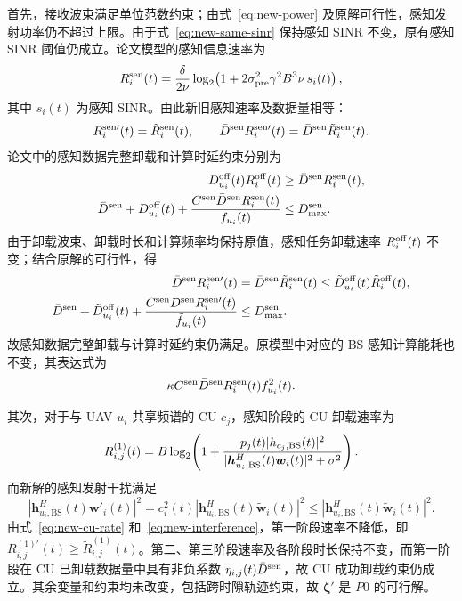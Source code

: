 \documentclass[11pt,a4paper]{ctexart}
\begin{document}
首先，接收波束满足单位范数约束；由式~\eqref{eq:new-power} 及原解可行性，感知发射功率仍不超过上限。由于式~\eqref{eq:new-same-sinr} 保持感知 SINR 不变，原有感知 SINR 阈值仍成立。论文模型的感知信息速率为
\begin{equation}\label{eq:new-rate-formula}
R_i^{\rm sen}(t)=\frac{\delta}{2\nu}\log_2\!\left(1+2\sigma_{\rm pre}^2\gamma^2B^3\nu\,s_i(t)\right),
\end{equation}
其中 $s_i(t)$ 为感知 SINR。由此新旧感知速率及数据量相等：
\begin{equation}\label{eq:new-same-rate}
R_i^{\rm sen\prime}(t)=\tilde R_i^{\rm sen}(t),\qquad
\bar D^{\rm sen}R_i^{\rm sen\prime}(t)=\bar D^{\rm sen}\tilde R_i^{\rm sen}(t).
\end{equation}
论文中的感知数据完整卸载和计算时延约束分别为
\begin{align}\label{eq:new-model-off}
D_{u_i}^{\rm off}(t) R_i^{\rm off}(t)&\ge\bar D^{\rm sen}R_i^{\rm sen}(t),\\
\bar D^{\rm sen}+D_{u_i}^{\rm off}(t)+\frac{C^{\rm sen}\bar D^{\rm sen}R_i^{\rm sen}(t)}{f_{u_i}(t)}&\le D_{\max}^{\rm sen}.\label{eq:new-model-delay}
\end{align}
由于卸载波束、卸载时长和计算频率均保持原值，感知任务卸载速率 $R_i^{\rm off}(t)$ 不变；结合原解的可行性，得
\begin{align}
\bar D^{\rm sen}R_i^{\rm sen\prime}(t)&=\bar D^{\rm sen}\tilde R_i^{\rm sen}(t)\le\tilde D_{u_i}^{\rm off}(t)\tilde R_i^{\rm off}(t),\label{eq:new-off}\\
\bar D^{\rm sen}+\tilde D_{u_i}^{\rm off}(t)+\frac{C^{\rm sen}\bar D^{\rm sen}R_i^{\rm sen\prime}(t)}{\tilde f_{u_i}(t)}&\le D_{\max}^{\rm sen}.\label{eq:new-delay}
\end{align}
故感知数据完整卸载与计算时延约束仍满足。原模型中对应的 BS 感知计算能耗也不变，其表达式为
\[
\kappa C^{\rm sen}\bar D^{\rm sen}R_i^{\rm sen}(t) f_{u_i}^2(t).
\]

其次，对于与 UAV $u_i$ 共享频谱的 CU $c_j$，感知阶段的 CU 卸载速率为
\begin{equation}\label{eq:new-cu-rate}
R_{i,j}^{(1)}(t)=B\log_2\!\left(1+\frac{p_j(t)|h_{c_j,\rm BS}(t)|^2}{|\bm h_{u_i,\rm BS}^H(t)\bm w_i(t)|^2+\sigma^2}\right).
\end{equation}
而新解的感知发射干扰满足
\begin{equation}\label{eq:new-interference}
\left|\bm h_{u_i,\mathrm{BS}}^H(t)\bm w'_i(t)\right|^2=c_i^2(t)\left|\bm h_{u_i,\mathrm{BS}}^H(t)\tilde{\bm w}_i(t)\right|^2\le\left|\bm h_{u_i,\mathrm{BS}}^H(t)\tilde{\bm w}_i(t)\right|^2.
\end{equation}
由式~\eqref{eq:new-cu-rate} 和~\eqref{eq:new-interference}，第一阶段速率不降低，即 $R_{i,j}^{(1)\prime}(t)\ge\tilde R_{i,j}^{(1)}(t)$。第二、第三阶段速率及各阶段时长保持不变，而第一阶段在 CU 已卸载数据量中具有非负系数 $\eta_{i,j}(t)\bar D^{\rm sen}$，故 CU 成功卸载约束仍成立。其余变量和约束均未改变，包括跨时隙轨迹约束，故 $\bm\zeta'$ 是 $P0$ 的可行解。
\end{document}
